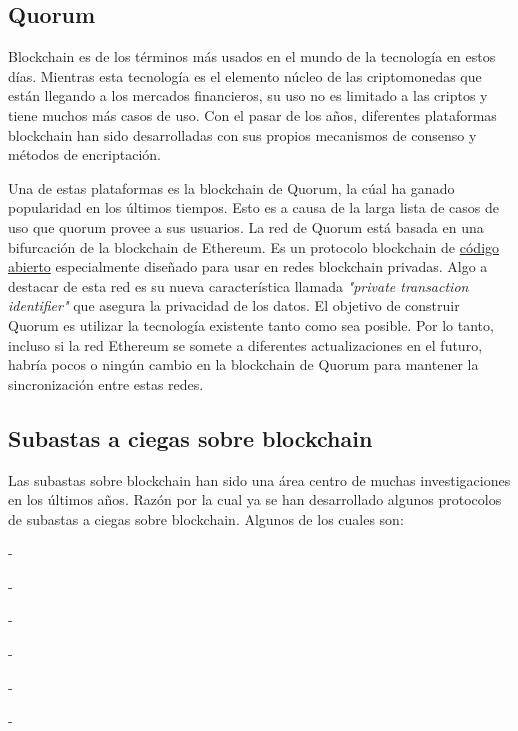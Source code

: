   \subsection{Quorum} \hspace*{}

    Blockchain es de los términos más usados en el mundo de la tecnología en estos días. Mientras esta tecnología es el elemento núcleo 
    de las criptomonedas que están llegando a los mercados financieros, su uso no es limitado a las criptos y tiene muchos más casos de uso.
    Con el pasar de los años, diferentes plataformas blockchain han sido desarrolladas con sus propios mecanismos de consenso y métodos de
    encriptación.

    Una de estas plataformas es la blockchain de Quorum, la cúal ha ganado popularidad en los últimos tiempos. Esto es a causa de la larga
    lista de casos de uso que quorum provee a sus usuarios. La red de Quorum está basada en una bifurcación de la blockchain de Ethereum.
    Es un protocolo blockchain de \href{https://github.com/ConsenSys/quorum}{código abierto} especialmente diseñado para usar en redes blockchain privadas. Algo a destacar de esta red
    es su nueva característica llamada \textit{"private transaction identifier"}  que asegura la privacidad de los datos. El objetivo de
    construir Quorum es utilizar la tecnología existente tanto como sea posible. Por lo tanto, incluso si la red Ethereum se somete a 
    diferentes actualizaciones en el futuro, habría pocos o ningún cambio en la blockchain de Quorum para mantener la sincronización entre
    estas redes. 


  \subsection{Subastas a ciegas sobre blockchain} \hspace*{}
    Las subastas sobre blockchain han sido una área centro de muchas investigaciones en los últimos años.
    Razón por la cual ya se han desarrollado algunos protocolos de subastas a ciegas sobre 
    blockchain. Algunos de los cuales son:

    - \cite{hawk2016}

    - \cite{blass2017strain}

    - \cite{galalyusef2018}

    - \cite{sanchez2020}

    - \cite{sharma2021}

    - \cite{li2021}
